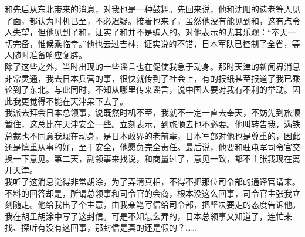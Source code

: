 和先后从东北带来的消息，对我也是一种鼓舞。先回来说，他和沈阳的遗老等人见了面，都认为时机已至，不必迟疑。接着也来了，虽然他没有能见到和，这有点令人失望，但他见到了和，证实了和并不是骗人的。对他表示的尤其乐观：“奉天一切完备，惟候乘临幸。”他也去过吉林，证实说的不错，日本军队已控制了全省，等人随时准备响应复辟。\\

除了这些之外，当时出现的一些谣言也在促使我急于动身。那时天津的新闻界消息非常灵通，我去日本兵营的事，很快就传到了社会上，有的报纸甚至报道了我已乘轮到了东北。与此同时，不知从哪里传来谣言，说中国人要对我有不利的举动。因此我更觉得不能在天津呆下去了。\\

我派去拜会日本总领事，说既然时机不至，我就不一定一直去奉天，不妨先到旅顺暂住，这总比在天津安全一些。立刻表示，到旅顺去也不必要。他叫转告我，满铁总裁也不同意我现在动身，是日本政界的老前辈，日本军部对他也是尊重的，因此还是慎重从事的好，至于安全，他愿负完全责任。最后说，他要和驻屯军司令官交换一下意见。第二天，副领事来找说，和商量过了，意见一致，都不主张我现在离开天津。\\

我听了这消息觉得非常胡涂，为了弄清真相，不得不把那位司令部的通译官请来。不料的回答却是，所谓总领事和司令官的会商，根本没这么回事，司令官主张我立刻随走。他给我出了个主意，由我亲笔写信给司令部，把坚决要走的态度告诉他。我在胡里胡涂中写了这封信。可是不知怎么弄的，日本总领事又知道了，连忙来找、探听有没有这回事，那封信是真的还是假的？……\\

